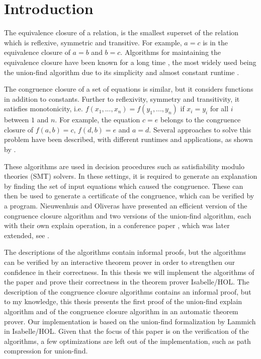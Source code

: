 
\chapter{Introduction}\label{chapter:introduction}

The equivalence closure of a relation, is the smallest superset of the relation which is reflexive, symmetric and transitive. For example, $a = c$ is in the equivalence closure of $a = b$ and $b = c$. Algorithms for maintaining the equivalence closure have been known for a long time \cite{unionfind-og}, the most widely used being the union-find algorithm due to its simplicity and almost constant runtime \cite{Tarjan}.

The congruence closure of a set of equations is similar, but it considers functions in addition to constants. Further to reflexivity, symmetry and transitivity, it satisfies monotonicity, i.e. $f(x_1, ... ,x_n) = f(y_1, ... ,y_n)$ if $x_i = y_i$ for all $i$ between $1$ and $n$. \cite{Nieuwenhuis} For example, the equation $c = e$ belongs to the congruence closure of $f(a,b) = c$, $f(d,b) = e$ and $a = d$. Several approaches to solve this problem have been described, with different runtimes and applications, as shown by \cite{congruenceclosure-og2,congruenceclosure-og,Nieuwenhuis}.

These algorithms are used in decision procedures such as satisfiability modulo theories (SMT) solvers. \cite{z3} In these settings, it is required to generate an explanation by finding the set of input equations which caused the congruence. These can then be used to generate a certificate of the congruence, which can be verified by a program. Nieuwenhuis and Oliveras have presented an efficient version of the congruence closure algorithm and two versions of the union-find algorithm, each with their own explain operation, in a conference paper \cite{Nieuwenhuis}, which was later extended, see \cite{Nieuwenhuis2}.

The descriptions of the algorithms contain informal proofs, but the algorithms can be verified by an interactive theorem prover in order to strengthen our confidence in their correctness. In this thesis we will implement the algorithms of the paper \cite{Nieuwenhuis} and prove their correctness in the theorem prover Isabelle/HOL.  The description of the congruence closure algorithms contains an informal proof, but to my knowledge, this thesis presents the first proof of the union-find explain algorithm and of the congruence closure algorithm in an automatic theorem prover. Our implementation is based on the union-find formalization by Lammich \cite{unionfind-isabelle} in Isabelle/HOL. Given that the focus of this paper is on the verification of the algorithms, a few optimizations are left out of the implementation, such as path compression for union-find.


